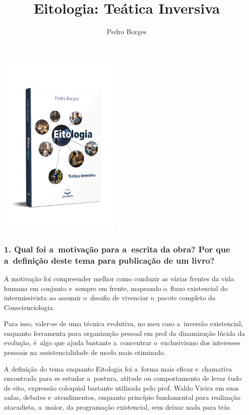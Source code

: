 \documentclass{gescons}
\author{Pedro Borges}
\title{Eitologia: Teática Inversiva}
\begin{document}
    \makeentrevistatitle

    \begin{multicols}{2}

\begin{center}
    \vspace{-1cm}
    \includegraphics[width=6cm]{articles/entrevista/mockups/Pedro_Borges.png}
\end{center}

\vspace{-1cm}

\subsubsection{1.       Qual foi a~motivação para a~escrita da obra? Por que a~definição deste tema para publicação de um livro?}

A motivação foi compreender melhor como conduzir as várias frentes da vida humana em conjunto e~sempre em frente, mapeando o~fluxo existencial do intermissivista ao assumir o~desafio de vivenciar o~pacote completo da Conscienciologia.

Para isso, valer-se de uma técnica evolutiva, no meu caso a~inversão existencial, enquanto ferramenta para organização pessoal em prol da dinamização lúcida da evolução, é~algo que ajuda bastante a~concentrar o~exclusivismo dos interesses pessoais na assistencialidade de modo mais otimizado.

A definição do tema enquanto Eitologia foi a~forma mais eficaz e~chamativa encontrada para se estudar a~postura, atitude ou comportamento de levar tudo de eito, expressão coloquial bastante utilizada pelo prof. Waldo Vieira em suas aulas, debates e~atendimentos, enquanto princípio fundamental para realização atacadista, a~maior, da programação existencial, sem deixar nada para trás.


\end{multicols}
\end{document}
